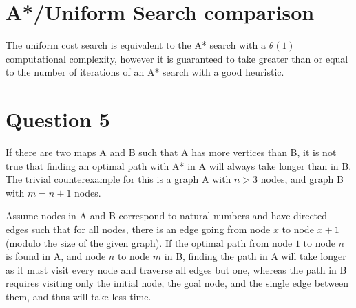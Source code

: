 \documentclass[11pt,a4paper]{article}
\begin{document}
\section{A*/Uniform Search comparison}

The uniform cost search is equivalent to the A* search with a \(\theta(1)\) computational complexity, however it is guaranteed to take greater than or equal to the number of iterations of an A* search with a good heuristic.


\section{Question 5}
If there are two maps A and B such that A has more vertices than B, it is not true that finding an optimal path with A* in A will always take longer than in B. The trivial counterexample for this is a graph A with \(n > 3\) nodes, and graph B with \(m = n + 1\) nodes.

Assume nodes in A and B correspond to natural numbers and have directed edges such that for all nodes, there is an edge going from node \(x\) to node \(x+1\) (modulo the size of the given graph). If the optimal path from node \(1\) to node \(n\) is found in A, and node \(n\) to node \(m\) in B, finding the path in A will take longer as it must visit every node and traverse all edges but one, whereas the path in B requires visiting only the initial node, the goal node, and the single edge between them, and thus will take less time.
\end{document}
